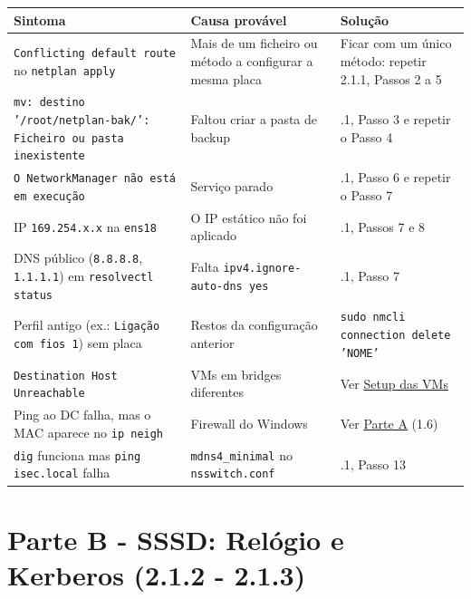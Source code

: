 \documentclass[11pt,a4paper,oneside]{report}
\begin{document}
\begin{center}\small
\begin{tabularx}{\linewidth}{|>{\raggedright\arraybackslash}X|>{\raggedright\arraybackslash}X|>{\raggedright\arraybackslash}X|}
\hline
\rowcolor{azul!10}\textbf{Sintoma} & \textbf{Causa provável} & \textbf{Solução} \\
\hline
\texttt{Conflicting default route} no \texttt{netplan apply} & Mais de um ficheiro ou método a configurar a mesma placa & Ficar com um único método: repetir 2.1.1, Passos 2 a 5 \\
\hline
\texttt{mv: destino '/\allowbreak{}root/\allowbreak{}netplan-bak/\allowbreak{}': Ficheiro ou pasta inexistente} & Faltou criar a pasta de backup & 2.1.1, Passo 3 e repetir o Passo 4 \\
\hline
\texttt{O NetworkManager não está em execução} & Serviço parado & 2.1.1, Passo 6 e repetir o Passo 7 \\
\hline
IP \texttt{169.254.x.x} na \texttt{ens18} & O IP estático não foi aplicado & 2.1.1, Passos 7 e 8 \\
\hline
DNS público (\texttt{8.8.8.8}, \texttt{1.1.1.1}) em \texttt{resolvectl status} & Falta \texttt{ipv4.ignore-auto-dns yes} & 2.1.1, Passo 7 \\
\hline
Perfil antigo (ex.: \texttt{Ligação com fios 1}) sem placa & Restos da configuração anterior & \texttt{sudo nmcli connection delete 'NOME'} \\
\hline
\texttt{Destination Host Unreachable} & VMs em bridges diferentes & Ver \hyperref[ec-setup]{Setup das VMs} \\
\hline
Ping ao DC falha, mas o MAC aparece no \texttt{ip neigh} & Firewall do Windows & Ver \hyperref[ec-a]{Parte A} (1.6) \\
\hline
\texttt{dig} funciona mas \texttt{ping isec.local} falha & \texttt{mdns4\_minimal} no \texttt{nsswitch.conf} & 2.1.1, Passo 13 \\
\hline
\end{tabularx}
\end{center}

\label{ec-b1-kerberos}

\section*{Parte B - SSSD: Relógio e Kerberos (2.1.2 - 2.1.3)}
\end{document}
